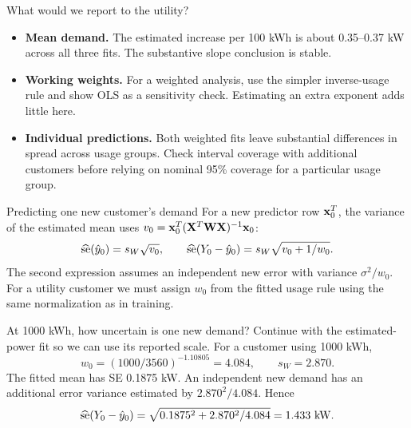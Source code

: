 \begin{frame}{What would we report to the utility?}
    \begin{itemize}
        \item \textbf{Mean demand.} The estimated increase per 100 kWh is about 0.35--0.37 kW across all three fits. The substantive slope conclusion is stable.
        \item \textbf{Working weights.} For a weighted analysis, use the simpler inverse-usage rule and show OLS as a sensitivity check. Estimating an extra exponent adds little here.
        \item \textbf{Individual predictions.} Both weighted fits leave substantial differences in spread across usage groups. Check interval coverage with additional customers before relying on nominal 95\% coverage for a particular usage group.
    \end{itemize}
\end{frame}
\begin{frame}{Predicting one new customer's demand}
    For a new predictor row $\mathbf{x}_0^T$, the variance of the estimated mean uses
    $v_0=\mathbf{x}_0^T(\mathbf{X}^T\mathbf{W}\mathbf{X})^{-1}\mathbf{x}_0$:
    \[
        \widehat{\operatorname{se}}(\hat y_0)=s_W\sqrt{v_0},\qquad
        \widehat{\operatorname{se}}(Y_0-\hat y_0)=s_W\sqrt{v_0+1/w_0}.
    \]
    The second expression assumes an independent new error with variance $\sigma^2/w_0$. For a utility customer we must assign $w_0$ from the fitted usage rule using the same normalization as in training.
\end{frame}

\begin{frame}{At 1000 kWh, how uncertain is one new demand?}
    Continue with the estimated-power fit so we can use its reported scale. For a customer using 1000 kWh,
    \[
        w_0=(1000/3560)^{-1.10805}=4.084,\qquad s_W=2.870.
    \]
    The fitted mean has SE 0.1875 kW. An independent new demand has an additional error variance estimated by $2.870^2/4.084$. Hence
    \[
        \widehat{\operatorname{se}}(Y_0-\hat y_0)
        =\sqrt{0.1875^2+2.870^2/4.084}=1.433\ \mathrm{kW}.
    \]
\end{frame}

